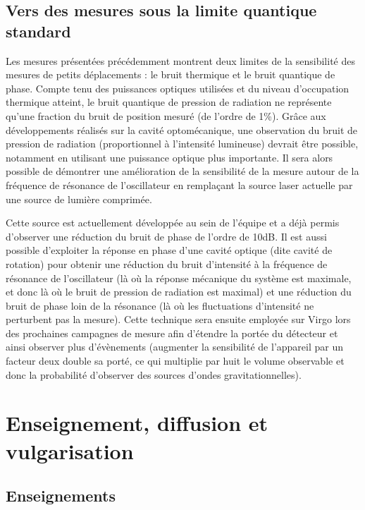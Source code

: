 \documentclass[12pt,a4paper]{article}
\begin{document}
\subsection{Vers des mesures sous la limite quantique standard}

Les mesures présentées précédemment montrent deux limites de la sensibilité des mesures de petits déplacements : le bruit thermique et le bruit quantique de phase.
Compte tenu des puissances optiques utilisées et du niveau d'occupation thermique atteint, le bruit quantique de pression de radiation ne représente qu'une fraction du bruit de position mesuré (de l'ordre de \unit{1}{\%}).
Grâce aux développements réalisés sur la cavité optomécanique, une observation du bruit de pression de radiation (proportionnel à l'intensité lumineuse) devrait être possible, notamment en utilisant une puissance optique plus importante.
Il sera alors possible de démontrer une amélioration de la sensibilité de la mesure autour de la fréquence de résonance de l'oscillateur en remplaçant la source laser actuelle par une source de lumière comprimée.

Cette source est actuellement développée au sein de l'équipe et a déjà permis d'observer une réduction du bruit de phase de l'ordre de \unit{10}{dB}.
Il est aussi possible d'exploiter la réponse en phase d'une cavité optique (dite cavité de rotation) pour obtenir une réduction du bruit d'intensité à la fréquence de résonance de l'oscillateur (là où la réponse mécanique du système est maximale, et donc là où le bruit de pression de radiation est maximal) et une réduction du bruit de phase loin de la résonance (là où les fluctuations d'intensité ne perturbent pas la mesure).
Cette technique sera ensuite employée sur Virgo lors des prochaines campagnes de mesure afin d'étendre la portée du détecteur et ainsi observer plus d'évènements (augmenter la sensibilité de l'appareil par un facteur deux double sa porté, ce qui multiplie par huit le volume observable et donc la probabilité d'observer des sources d'ondes gravitationnelles).

\section{Enseignement, diffusion et vulgarisation}

\subsection{Enseignements}
\end{document}

